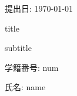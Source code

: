 \begin{titlepage}
    \begin{center}

        {\Large 提出日: \today}

        

        \vspace{40truept}

        

        \vspace*{180truept}

        {\Huge  title} 
        \vspace{10truept}

        {\Huge subtitle}
        \vspace{160truept}


        {\Large 学籍番号: num}
        \vspace{10truept}

        \vspace{10truept}
        {\Large 氏名: name} 
        \vspace{10truept}

        {\Large }  

    \end{center}
\end{titlepage}